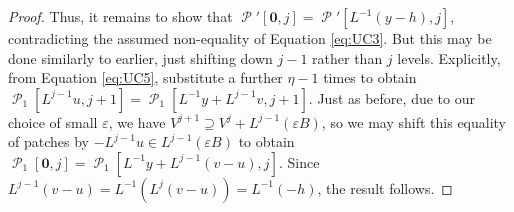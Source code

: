 \documentclass[10pt,a4paper]{amsart}
\DeclareMathOperator{\cP}{\mathcal{P}}
\renewcommand{\epsilon}{\varepsilon}
\begin{document}
\begin{proof}
Thus, it remains to show that \(\cP'[\mathbf{0},j] = \cP'[L^{-1}(y-h),j]\), contradicting the assumed non-equality of Equation \ref{eq:UC3}. But this may be done similarly to earlier, just shifting down \(j-1\) rather than \(j\) levels. Explicitly, from Equation \ref{eq:UC5}, substitute a further \(\eta-1\) times to obtain \(\cP_1[L^{j-1} u,j+1] = \cP_1[L^{-1} y + L^{j-1} v,j+1]\). Just as before, due to our choice of small \(\epsilon\), we have \(V^{j+1} \supseteq V^j + L^{j-1}(\epsilon B)\), so we may shift this equality of patches by \(-L^{j-1} u \in L^{j-1}(\epsilon B)\) to obtain \(\cP_1[\mathbf{0},j] = \cP_1[L^{-1} y + L^{j-1}(v-u),j]\). Since \(L^{j-1}(v-u) = L^{-1}(L^j(v-u)) = L^{-1}(-h)\), the result follows.
\end{proof}
\end{document}
